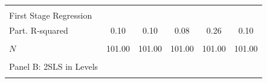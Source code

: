 \begin{center}
\begin{tabular}{lccccc}
\noalign{\smallskip} &  &  &  &  & \\
First Stage Regression & \begin{footnotesize}\end{footnotesize} & \begin{footnotesize}\end{footnotesize} & \begin{footnotesize}\end{footnotesize} & \begin{footnotesize}\end{footnotesize} & \begin{footnotesize}\end{footnotesize}\\
\noalign{\smallskip}Part. R-squared & 0.10 & 0.10 & 0.08 & 0.26 & 0.10\\
 & \begin{footnotesize}\end{footnotesize} & \begin{footnotesize}\end{footnotesize} & \begin{footnotesize}\end{footnotesize} & \begin{footnotesize}\end{footnotesize} & \begin{footnotesize}\end{footnotesize}\\
\noalign{\smallskip}$N$ & 101.00 & 101.00 & 101.00 & 101.00 & 101.00\\
 & \begin{footnotesize}\end{footnotesize} & \begin{footnotesize}\end{footnotesize} & \begin{footnotesize}\end{footnotesize} & \begin{footnotesize}\end{footnotesize} & \begin{footnotesize}\end{footnotesize}\\
\noalign{\smallskip}Panel B: 2SLS in Levels &  &  &  &  & \\
 & \begin{footnotesize}\end{footnotesize} & \begin{footnotesize}\end{footnotesize} & \begin{footnotesize}\end{footnotesize} & \begin{footnotesize}\end{footnotesize} & \begin{footnotesize}\end{footnotesize}\\

\end{tabular}
\end{center}
